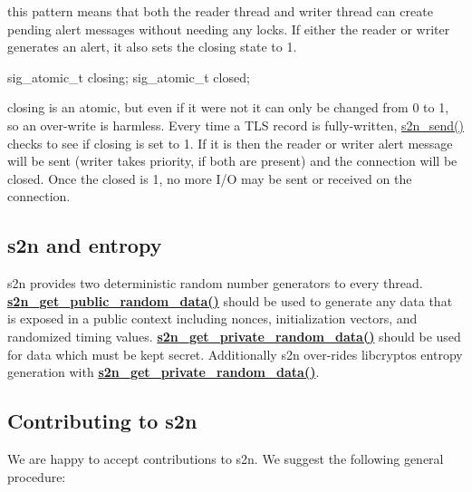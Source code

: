 this pattern means that both the reader thread and writer thread can create pending alert messages without needing any locks. If either the reader or writer generates an alert, it also sets the \textquotesingle{}closing\textquotesingle{} state to 1.


\begin{DoxyCode}
sig\_atomic\_t closing;
sig\_atomic\_t closed;
\end{DoxyCode}


\textquotesingle{}closing\textquotesingle{} is an atomic, but even if it were not it can only be changed from 0 to 1, so an over-\/write is harmless. Every time a T\+LS record is fully-\/written, \hyperlink{s2n_8h_a6d221800840cc73c57109088dac2f467}{s2n\+\_\+send()} checks to see if closing is set to 1. If it is then the reader or writer alert message will be sent (writer takes priority, if both are present) and the connection will be closed. Once the closed is 1, no more I/O may be sent or received on the connection.

\subsection*{s2n and entropy}

s2n provides two deterministic random number generators to every thread. {\bfseries \hyperlink{s2n__random_8c_a5cfef84444cc08086a4098569c9f1fc8}{s2n\+\_\+get\+\_\+public\+\_\+random\+\_\+data()}} should be used to generate any data that is exposed in a public context including nonces, initialization vectors, and randomized timing values. {\bfseries \hyperlink{s2n__random_8c_aaad2cf7ed73ddf58358fb714b1abfb39}{s2n\+\_\+get\+\_\+private\+\_\+random\+\_\+data()}} should be used for data which must be kept secret. Additionally s2n over-\/rides libcrypto\textquotesingle{}s entropy generation with {\bfseries \hyperlink{s2n__random_8c_aaad2cf7ed73ddf58358fb714b1abfb39}{s2n\+\_\+get\+\_\+private\+\_\+random\+\_\+data()}}.

\subsection*{Contributing to s2n}

We are happy to accept contributions to s2n. We suggest the following general procedure\+:


